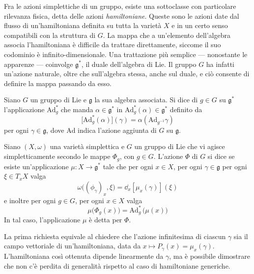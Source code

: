 Fra le azioni simplettiche di un gruppo, esiste una sottoclasse con particolare rilevanza fisica, detta delle azioni \emph{hamiltoniane}. Queste sono le azioni date dal flusso di un'hamiltoniana definita su tutta la varietà $X$ e in un certo senso compatibili con la struttura di $G$. La mappa che a un'elemento dell'algebra associa l'hamiltoniana è difficile da trattare direttamente, siccome il suo codominio è infinito-dimensionale. Una trattazione più semplice --- nonostante le apparenze --- coinvolge $\mathfrak{g}^*$, il duale dell'algebra di Lie. Il gruppo $G$ ha infatti un'azione naturale, oltre che sull'algebra stessa, anche sul duale, e ciò consente di definire la mappa passando da esso.
\begin{definition}
  Siano $G$ un gruppo di Lie e $\mathfrak{g}$ la sua algebra associata. Si dice  di $g \in G$ su $\mathfrak{g}^*$ l'applicazione $\mathrm{Ad}_g^*$ che manda $\alpha \in \mathfrak{g}^*$ in $\mathrm{Ad}^*_g(\alpha) \in \mathfrak{g}^*$ definito da
  \begin{equation*}
  \big[\mathrm{Ad}^*_g(\alpha)\big](\gamma) = \alpha(\mathrm{Ad}_{g^{-1}}\gamma)
  \end{equation*}
  per ogni $\gamma \in \mathfrak{g}$, dove $\mathrm{Ad}$ indica l'azione aggiunta di $G$ su $\mathfrak{g}$.
\end{definition}
\begin{definition}
  Siano $(X, \omega)$ una varietà simplettica e $G$ un gruppo di Lie che vi agisce simpletticamente secondo le mappe $\Phi_g$, con $g \in G$. L'azione $\Phi$ di $G$ si dice  se esiste un'applicazione $\mu: X \to \mathfrak{g}^*$ tale che  per ogni $x \in X$, per ogni $\gamma \in \mathfrak{g}$ per ogni $\xi \in T_x X$ valga
  \begin{equation*}
  \omega\big((\phi_{\gamma})_x, \xi\big) = \dd_x [\mu_x(\gamma)](\xi)
  \end{equation*} 
  e inoltre per ogni $g \in G$, per ogni $x \in X$ valga
  \begin{equation*}
  \mu\big(\Phi_g(x)\big) = \mathrm{Ad}_g^*\, \big(\mu(x)\big)
  \end{equation*} 
  In tal caso, l'applicazione $\mu$ è detta  per $\Phi$.
\end{definition}
\begin{remark}
  La prima richiesta equivale al chiedere che l'azione infinitesima di ciascun $\gamma$ sia il campo vettoriale di un'hamiltoniana, data da $x \mapsto P_{\gamma}(x) = \mu_x(\gamma)$. L'hamiltoniana così ottenuta dipende linearmente da $\gamma$, ma è possibile dimostrare che non c'è perdita di generalità rispetto al caso di hamiltoniane generiche.
\end{remark}
